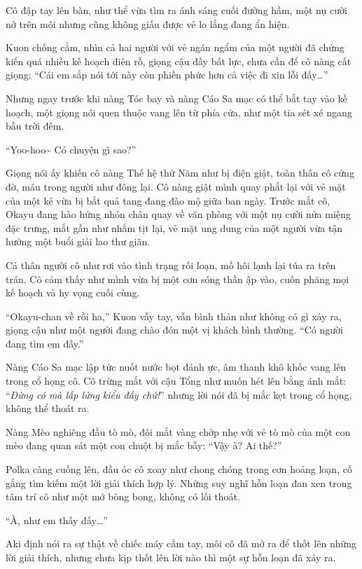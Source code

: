 \documentclass[../main.tex]{subfiles}
\begin{document}
Cô đập tay lên bàn, như thể vừa tìm ra ánh sáng cuối đường hầm, một nụ cười nở trên môi nhưng cũng không giấu được vẻ lo lắng đang ẩn hiện.

Kuon chống cằm, nhìn cả hai người với vẻ ngán ngẩm của một người đã chứng kiến quá nhiều kế hoạch điên rồ, giọng cậu đầy bất lực, chưa cần để cô nàng cất giọng: ``Cái em sắp nói tới này còn phiền phức hơn cả việc đi xin lỗi đấy\dots''

Nhưng ngay trước khi nàng Tóc bay và nàng Cáo Sa mạc có thể bắt tay vào kế hoạch, một giọng nói quen thuộc vang lên từ phía cửa, như một tia sét xé ngang bầu trời đêm.

``Yoo-hoo\~{} Có chuyện gì sao?''

Giọng nói ấy khiến cô nàng Thế hệ thứ Năm như bị điện giật, toàn thân cô cứng đờ, máu trong người như đông lại. Cô nàng giật mình quay phắt lại với vẻ mặt của một kẻ vừa bị bắt quả tang đang đào mộ giữa ban ngày. Trước mắt cô, Okayu đang hào hứng nhón chân quay về văn phòng với một nụ cười nửa miệng đặc trưng, mắt gần như nhắm tịt lại, vẻ mặt ung dung của một người vừa tận hưởng một buổi giải lao thư giãn.

Cả thân người cô như rơi vào tình trạng rối loạn, mồ hôi lạnh lại túa ra trên trán. Cô cảm thấy như mình vừa bị một cơn sóng thần ập vào, cuốn phăng mọi kế hoạch và hy vọng cuối cùng.

``Okayu-chan về rồi ha,'' Kuon vẫy tay, vẫn bình thản như không có gì xảy ra, giọng cậu như một người đang chào đón một vị khách bình thường. ``Có người đang tìm em đấy.''

Nàng Cáo Sa mạc lập tức nuốt nước bọt đánh ực, âm thanh khô khốc vang lên trong cổ họng cô. Cô trừng mắt với cậu Tổng như muốn hét lên bằng ánh mắt: ``\textit{Đừng có mà lấp lửng kiểu đấy chứ!}'' nhưng lời nói đã bị mắc kẹt trong cổ họng, không thể thoát ra.

Nàng Mèo nghiêng đầu tò mò, đôi mắt vàng chớp nhẹ với vẻ tò mò của một con mèo đang quan sát một con chuột bị mắc bẫy: ``Vậy à? Ai thế?''

Polka càng cuống lên, đầu óc cô xoay như chong chóng trong cơn hoảng loạn, cố gắng tìm kiếm một lời giải thích hợp lý. Những suy nghĩ hỗn loạn đan xen trong tâm trí cô như một mớ bòng bong, không có lối thoát.

``À, như em thấy đấy\dots''

Aki định nói ra sự thật về chiếc máy cầm tay, môi cô đã mở ra để thốt lên những lời giải thích, nhưng chưa kịp thốt lên lời nào thì một sự hỗn loạn đã xảy ra.
\end{document}
